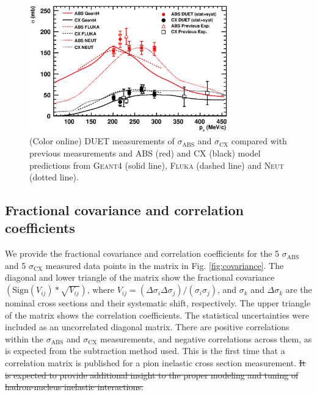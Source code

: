 \begin{figure}[h]
\begin{center}
\includegraphics[width=86mm]{figures/duet_result_for_sep_paper_v2.eps}
\caption{(Color online) DUET measurements of $\sigma_{\mathrm{ABS}}$ and $\sigma_{\mathrm{CX}}$ compared with previous measurements \cite{Bellotti1973,Ashery2,Bellotti1973_2,Jones} and ABS (red) and CX (black) model predictions from \textsc{Geant4} (solid line), \textsc{Fluka} (dashed line) and \textsc{Neut} (dotted line).}
\label{fig:result}
\end{center} 
\end{figure}
{\color{red}
\subsection{Fractional covariance and correlation coefficients}}
We provide the fractional covariance and correlation coefficients for the 5 $\sigma_{\mathrm{ABS}}$ and 5 $\sigma_{\mathrm{CX}}$ measured data points in the matrix in Fig. \ref{fig:covariance}. {\color{red} The diagonal and lower triangle of the matrix show the fractional covariance $(\mathrm{Sign}(V_{ij})*\sqrt{V_{ij}})$, where $V_{ij} = (\Delta\sigma_{i}\Delta\sigma_{j})/(\sigma_{i}\sigma_{j})$, and $\sigma_{k}$ and $\Delta\sigma_{k}$ are the nominal cross sections and their systematic shift, respectively. The upper triangle of the matrix shows the correlation coefficients.}
The statistical uncertainties were included as an uncorrelated diagonal matrix. There are positive correlations within the $\sigma_{\mathrm{ABS}}$ and $\sigma_{\mathrm{CX}}$ measurements, and negative correlations across them, as is expected from the subtraction method used. This is the first time that a correlation matrix is published for a pion inelastic cross section measurement. \st{It is expected to provide additional insight to the proper modeling and tuning of hadron-nucleus inelastic interactions.}


